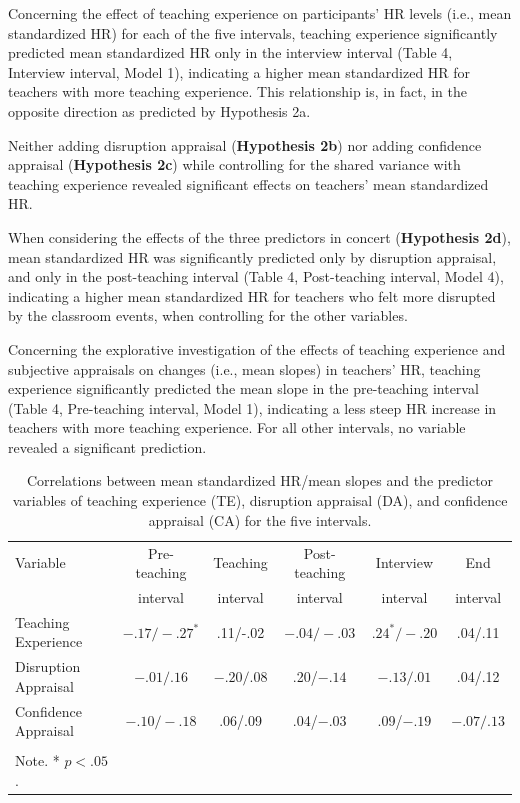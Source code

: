 \documentclass[preprint, 3p,
authoryear]{elsarticle} %
\begin{document}
Concerning the effect of teaching experience on participants' HR levels
(i.e., mean standardized HR) for each of the five intervals, teaching
experience significantly predicted mean standardized HR only in the
interview interval (Table 4, Interview interval, Model 1), indicating a
higher mean standardized HR for teachers with more teaching experience.
This relationship is, in fact, in the opposite direction as predicted by
Hypothesis 2a.

Neither adding disruption appraisal (\textbf{Hypothesis 2b}) nor adding
confidence appraisal (\textbf{Hypothesis 2c}) while controlling for the
shared variance with teaching experience revealed significant effects on
teachers' mean standardized HR.

When considering the effects of the three predictors in concert
(\textbf{Hypothesis 2d}), mean standardized HR was significantly
predicted only by disruption appraisal, and only in the post-teaching
interval (Table 4, Post-teaching interval, Model 4), indicating a higher
mean standardized HR for teachers who felt more disrupted by the
classroom events, when controlling for the other variables.

Concerning the explorative investigation of the effects of teaching
experience and subjective appraisals on changes (i.e., mean slopes) in
teachers' HR, teaching experience significantly predicted the mean slope
in the pre-teaching interval (Table 4, Pre-teaching interval, Model 1),
indicating a less steep HR increase in teachers with more teaching
experience. For all other intervals, no variable revealed a significant
prediction.

\renewcommand{\arraystretch}{1.5}

\begin{table}[ht]
    \centering
    \begin{tabularx}{\textwidth}{lccccc}
        \toprule
        Variable & Pre-teaching & Teaching & Post-teaching & Interview & End \\
        & interval & interval & interval & interval & interval \\
        \midrule
        Teaching Experience & $- .17/ - .27^*$ & .11/-.02 & $- .04/-.03$ & $.24^*/-.20$ & .04/.11 \\
        Disruption Appraisal & $- .01/.16$ & $- .20/.08$ & .20/$- .14$ & $- .13/.01$ & .04/.12 \\
        Confidence Appraisal & $- .10/ - .18$ & .06/.09 & .04/$- .03$ & .09/$- .19$ & $- .07/.13$ \\
        \bottomrule \\
          Note. * $p < .05$.
    \end{tabularx}
    \caption{Correlations between mean standardized HR/mean slopes and the predictor variables of teaching experience (TE), disruption appraisal (DA), and confidence appraisal (CA) for the five intervals.}
    \label{tab_3}
\end{table}
\end{document}
